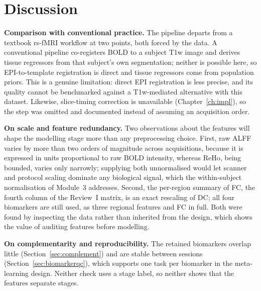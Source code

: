 \documentclass{ssnreview}
\begin{document}
\section{Discussion}

\textbf{Comparison with conventional practice.} The pipeline departs from a textbook
rs-fMRI workflow at two points, both forced by the data. A conventional pipeline
co-registers BOLD to a subject T1w image and derives tissue regressors from that subject's
own segmentation; neither is possible here, so EPI-to-template registration is direct and
tissue regressors come from population priors. This is a genuine limitation: direct EPI
registration is less precise, and its quality cannot be benchmarked against a T1w-mediated
alternative with this dataset. Likewise, slice-timing correction is unavailable
(Chapter~\ref{ch:impl}), so the step was omitted and documented instead of assuming an
acquisition order.

\textbf{On scale and feature redundancy.} Two observations about the features will shape the
modelling stage more than any preprocessing choice. First, raw ALFF varies by more than two
orders of magnitude across acquisitions, because it is expressed in units proportional to raw
BOLD intensity, whereas ReHo, being bounded, varies only narrowly; supplying both unnormalised
would let scanner and protocol scaling dominate any biological signal, which the within-subject
normalisation of Module~3 addresses. Second, the per-region summary of FC, the fourth column of
the Review~I matrix, is an exact rescaling of DC; all four biomarkers are still used, as three
regional features and FC in full. Both were found by inspecting the data rather than inherited
from the design, which shows the value of auditing features before modelling.

\textbf{On complementarity and reproducibility.} The retained biomarkers overlap little
(Section~\ref{sec:complement}) and are stable between sessions (Section~\ref{sec:biomarkerqc}), which
supports one task per biomarker in the meta-learning design. Neither check uses a stage label, so
neither shows that the features separate stages.
\end{document}
